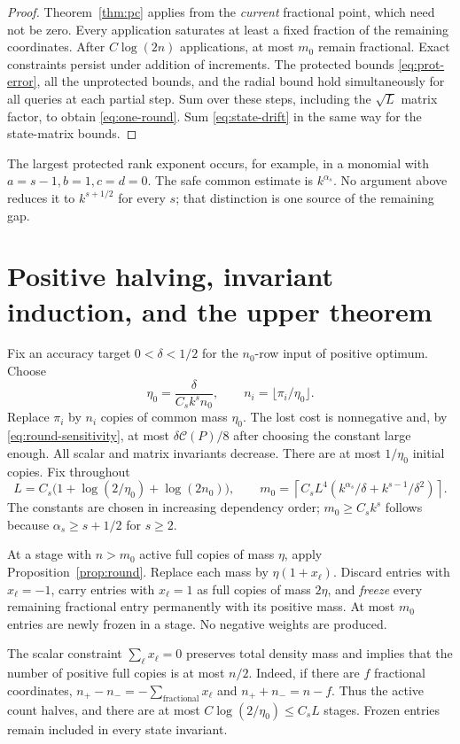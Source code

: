 \documentclass[11pt]{article}
\theoremstyle{remark}\newtheorem{remark}[theorem]{Remark}
\newcommand{\cost}{\mathcal C}\newcommand{\OPT}{\mathsf{OPT}}
\begin{document}
\begin{proof}
Theorem~\ref{thm:pc} applies from the \emph{current} fractional point, which need not be zero. Every application saturates at least a fixed fraction of the remaining coordinates. After $C\log(2n)$ applications, at most $m_0$ remain fractional. Exact constraints persist under addition of increments. The protected bounds \eqref{eq:prot-error}, all the unprotected bounds, and the radial bound hold simultaneously for all queries at each partial step. Sum over these steps, including the $\sqrt L$ matrix factor, to obtain \eqref{eq:one-round}. Sum \eqref{eq:state-drift} in the same way for the state-matrix bounds.
\end{proof}

The largest protected rank exponent occurs, for example, in a monomial with $a=s-1,b=1,c=d=0$. The safe common estimate is $k^{\alpha_s}$. No argument above reduces it to $k^{s+1/2}$ for every $s$; that distinction is one source of the remaining gap.

\section{Positive halving, invariant induction, and the upper theorem}\label{sec:upper-finish}
Fix an accuracy target $0<\delta<1/2$ for the $n_0$-row input of positive optimum. Choose
\[
 \eta_0=\frac{\delta}{C_s k^s n_0},\qquad n_i=\lfloor\pi_i/\eta_0\rfloor.
\]
Replace $\pi_i$ by $n_i$ copies of common mass $\eta_0$. The lost cost is nonnegative and, by \eqref{eq:round-sensitivity}, at most $\delta\cost(P)/8$ after choosing the constant large enough. All scalar and matrix invariants decrease. There are at most $1/\eta_0$ initial copies. Fix throughout
\begin{equation}\label{eq:m0}
 L=C_s\bigl(1+\log(2/\eta_0)+\log(2n_0)\bigr),\qquad
 m_0=\left\lceil C_s L^4\left(k^{\alpha_s}/\delta+k^{s-1}/\delta^2\right)\right\rceil.
\end{equation}
The constants are chosen in increasing dependency order; $m_0\ge C_s k^s$ follows because $\alpha_s\ge s+1/2$ for $s\ge2$.

At a stage with $n>m_0$ active full copies of mass $\eta$, apply Proposition~\ref{prop:round}. Replace each mass by $\eta(1+x_\ell)$. Discard entries with $x_\ell=-1$, carry entries with $x_\ell=1$ as full copies of mass $2\eta$, and \emph{freeze} every remaining fractional entry permanently with its positive mass. At most $m_0$ entries are newly frozen in a stage. No negative weights are produced.

The scalar constraint $\sum_\ell x_\ell=0$ preserves total density mass and implies that the number of positive full copies is at most $n/2$. Indeed, if there are $f$ fractional coordinates, $n_+-n_-=-\sum_{\mathrm{fractional}}x_\ell$ and $n_++n_-=n-f$. Thus the active count halves, and there are at most $C\log(2/\eta_0)\le C_sL$ stages. Frozen entries remain included in every state invariant.
\end{document}
